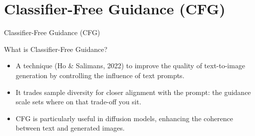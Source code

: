 \section{Classifier-Free Guidance (CFG)}
\begin{frame}{}
    \LARGE Classifier-Free Guidance (CFG)
\end{frame}

\begin{frame}{What is Classifier-Free Guidance?}
    \begin{itemize}
        \item A technique (Ho \& Salimans, 2022) to improve the quality of text-to-image generation by controlling the influence of text prompts.
        \item It trades sample diversity for closer alignment with the prompt: the guidance scale sets where on that trade-off you sit.
        \item CFG is particularly useful in diffusion models, enhancing the coherence between text and generated images.
    \end{itemize}
\end{frame}

